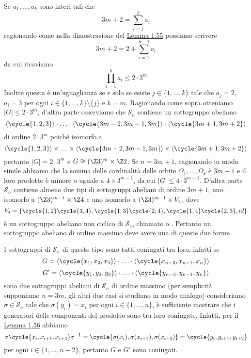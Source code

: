 \documentclass[11pt]{scrartcl}
\begin{document}
	\begin{remark}
		Se $a_1, \ldots, a_k$ sono interi tali che 
		\[
		3m + 2 = \sum_{i = 1}^k a_i
		\]
		ragionando come nella dimostrazione del \hyperref[lemma1.55]{Lemma 1.55}
		possiamo scrivere
		\[
		3m + 2 = 2 + \sum_{i = 1}^{k - 1}a_i
		\]
		da cui ricaviamo
		\[
		\prod_{i = 1}^k a_i \leqslant 2\cdot3^m
		\]
		Inoltre questa è un'uguaglianza se e solo se esiste $j \in \{1, \ldots, k\}$
		tale che $a_j = 2$, $a_i = 3$ per ogni $i \in \{1, \ldots, k\}\setminus\{j\}$
		e $k = m$. Ragionando come sopra otteniamo $|G| \leqslant 2\cdot 3^m$, 
		d'altra parte osserviamo che $\mathcal{S}_n$ contiene un sottogruppo abeliano
		\[
		\langle\cycle{1, 2, 3}\rangle\cdot\ldots\cdot\langle\cycle{3m - 2, 3m - 1, 3m}\rangle\cdot\langle\cycle{3m + 1, 3m + 2}\rangle
		\]
		di ordine $2\cdot3^m$ poiché isomorfo a 
		\[
		\langle\cycle{1, 2, 3}\rangle\times\ldots\times\langle\cycle{3m - 2, 3m - 1, 3m}\rangle\times\langle\cycle{3m + 1, 3m + 2}\rangle
		\]
		pertanto $|G| = 2\cdot3^m$ e $G \cong (\Z3)^m \times \Z2$.
		Se $n = 3m + 1$, ragionando in modo simile abbiamo che la somma delle
		cardinalità delle orbite $\Omega_1, \ldots, \Omega_k$ è $3m + 1$ e il 
		loro prodotto è minore o uguale a $4\times 3^{m - 1}$, da cui $|G| \leq
		4\cdot3^{m - 1}$. D'altra parte $\mathcal{S}_n$ contiene almeno due tipi di 
		sottogruppi abeliani di ordine $3m + 1$, uno isomorfo a 
		$(\Z3)^{m - 1} \times \Z4$ e uno isomorfo a $(\Z3)^{m - 1}\times V_4$,
		dove 
		\[
		V_4 = \{\cycle{1, 2}\cycle{3, 4}, \cycle{1, 3}\cycle{2, 4}, 
		\cycle{1, 4}\cycle{2, 3}, id\}
		\]
		è un sottogruppo abeliano non ciclico di $\mathcal{S}_4$, chiamato 
		 o . Pertanto un sottogruppo
		abeliano di ordine massimo deve avere una di queste due forme.
	\end{remark}
	
	\begin{remark}
		I sottogruppi di $\mathcal{S}_n$ di questo tipo sono tutti coniugati tra loro, infatti
		se 
		\[
		G = \langle\cycle{x_1, x_2, x_3}\rangle\cdot\ldots\cdot\langle\cycle{x_{n - 2}, x_{n - 1}, x_n}\rangle
		\]
		\[
		G' = \langle\cycle{y_1, y_2, y_3}\rangle\cdot\ldots\cdot\langle\cycle{y_{n - 2}, y_{n - 1}, y_n}\rangle
		\]
		sono due sottogruppi abeliani di $\mathcal{S}_n$ di ordine massimo (per semplicità
		supponiamo $n = 3m$, gli altri due casi si studiano in modo analogo)
		consideriamo $\sigma \in \mathcal{S}_n$ tale che $\sigma(y_i) = x_i$ per ogni 
		$i \in \{1, \ldots, n\}$, è sufficiente mostrare che i generatori delle componenti del
		prodotto sono tra loro coniugate. Infatti, per il \hyperref[lemma1.56]{Lemma 1.56}
		abbiamo 
		\[
		\sigma\cycle{x_i, x_{i + 1}, x_{i + 2}}\sigma^{-1} = 
		\cycle{\sigma(x_i), \sigma(x_{i + 1}), \sigma(x_{i + 2})} = 
		\cycle{y_i, y_{i + 1}, y_{i + 2}}
		\]
		per ogni $i \in \{1, \ldots, n - 2\}$, pertanto $G$ e $G'$ sono coniugati.
	\end{remark}
	
\end{document}
